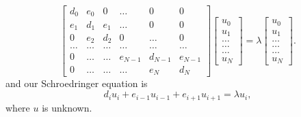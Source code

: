 \documentclass[10pt]{article}
\begin{document}
\begin{multicols}{2}
\begin{equation*}
    \begin{bmatrix}
        d_0    & e_0   & 0      & \dots & 0     & 0 \\
        e_1    & d_1   & e_1    & \dots & 0     &0 \\
        0      & e_2   & d_2    & 0     & \dots & 0\\
        \dots  & \dots & \dots  & \dots & \dots & \dots\\
        0      & \dots & \dots  & e_{N-1}     &d_{N-1} & e_{N-1}\\
        0      & \dots & \dots  & \dots & e_{N} & d_{N}
    \end{bmatrix}
    \begin{bmatrix} 
        u_{0} \\ u_{1} \\ \dots\\ \dots\\ \dots\\ u_{N} 
    \end{bmatrix}
    =\lambda \begin{bmatrix} 
        u_{0} \\ u_{1} \\ \dots\\ \dots\\ \dots\\ u_{N}
    \end{bmatrix}.  
    \label{eq:sematrix}
\end{equation*}
and our Schroedringer equation is
\begin{equation*}
d_iu_i+e_{i-1}u_{i-1}+e_{i+1}u_{i+1}  = \lambda u_i,
\end{equation*}
where $u$ is unknown. 

\end{multicols}
\end{document}
